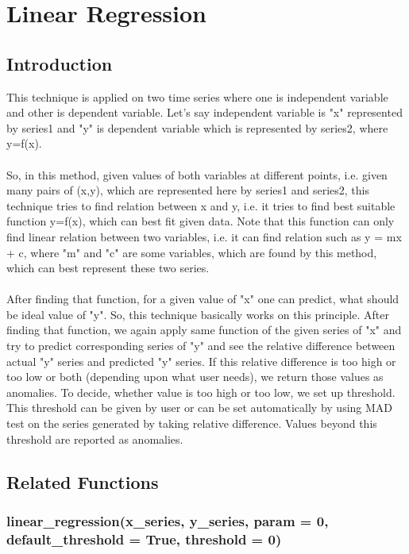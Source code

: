 \chapter{Linear Regression}
\label{appendix:linearRegression}
\section{Introduction}

This technique is applied on two time series where one is independent variable 
and other is dependent variable. Let's say independent variable 
is "x" represented by series1 and "y" is dependent variable which is 
represented by series2, where y=f(x). \\
\\
So, in this method, given values of both variables at different points, i.e. 
given many pairs of (x,y), which are represented here by series1 and series2, 
this technique tries to find relation between x and y, i.e. it tries to find 
best suitable function y=f(x), which can best fit given data. Note that this 
function can only find linear relation between two variables, i.e. it can find 
relation such as y = mx + c, where "m" and "c" are some variables, which are 
found by this method, which can best represent these two series. \\
\\
After finding that function, for a given value of "x" one can predict, what 
should be ideal value of "y". So, this technique basically works on this 
principle. After finding that function, we again apply same function of the 
given series of "x" and try to predict corresponding series of "y" and see the 
relative difference between actual "y" series and predicted "y" series. If this 
relative difference is too high or too low or both (depending upon 
what user needs), we return those values as anomalies. To decide, whether value 
is too high or too low, we set up threshold. This threshold can be given by user 
or can be set automatically by using MAD test on the series generated by taking 
relative difference. Values beyond this threshold are reported as anomalies.

\section{Related Functions}

\subsection{linear\_regression(x\_series, y\_series, param = 0, 
default\_threshold = True, threshold = 0)}

